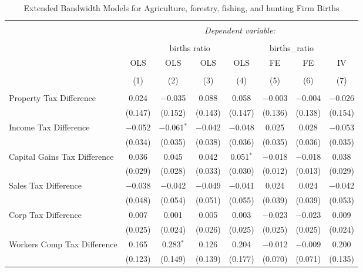
\begin{table}[!htbp] \centering 
  \caption{Extended Bandwidth Models for  Agriculture, forestry, fishing, and hunting Firm Births} 
  \label{} 
\begin{tabular}{@{\extracolsep{5pt}}lccccccc} 
\\[-1.8ex]\hline 
\hline \\[-1.8ex] 
 & \multicolumn{7}{c}{\textit{Dependent variable:}} \\ 
\cline{2-8} 
\\[-1.8ex] & \multicolumn{4}{c}{births ratio} & \multicolumn{2}{c}{births\_ratio} &   \\ 
 & OLS & OLS & OLS & OLS & FE & FE & IV \\ 
\\[-1.8ex] & (1) & (2) & (3) & (4) & (5) & (6) & (7)\\ 
\hline \\[-1.8ex] 
 Property Tax Difference & 0.024 & $-$0.035 & 0.088 & 0.058 & $-$0.003 & $-$0.004 & $-$0.026 \\ 
  & (0.147) & (0.152) & (0.143) & (0.147) & (0.136) & (0.138) & (0.154) \\ 
  Income Tax Difference & $-$0.052 & $-$0.061$^{*}$ & $-$0.042 & $-$0.048 & 0.025 & 0.028 & $-$0.053 \\ 
  & (0.034) & (0.035) & (0.038) & (0.036) & (0.035) & (0.036) & (0.035) \\ 
  Capital Gains Tax Difference & 0.036 & 0.045 & 0.042 & 0.051$^{*}$ & $-$0.018 & $-$0.018 & 0.038 \\ 
  & (0.029) & (0.028) & (0.033) & (0.030) & (0.012) & (0.013) & (0.029) \\ 
  Sales Tax Difference & $-$0.038 & $-$0.042 & $-$0.049 & $-$0.041 & 0.024 & 0.024 & $-$0.042 \\ 
  & (0.048) & (0.054) & (0.051) & (0.055) & (0.039) & (0.039) & (0.053) \\ 
  Corp Tax Difference & 0.007 & 0.001 & 0.005 & 0.003 & $-$0.023 & $-$0.023 & 0.009 \\ 
  & (0.025) & (0.024) & (0.026) & (0.025) & (0.025) & (0.025) & (0.024) \\ 
  Workers Comp Tax Difference & 0.165 & 0.283$^{*}$ & 0.126 & 0.204 & $-$0.012 & $-$0.009 & 0.200 \\ 
  & (0.123) & (0.149) & (0.139) & (0.177) & (0.070) & (0.071) & (0.135) \\ 

\end{tabular}
\end{table}
